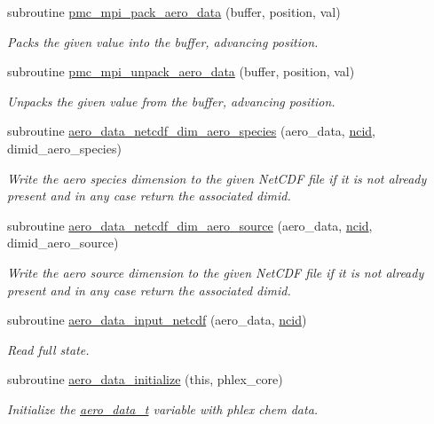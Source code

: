 \begin{DoxyCompactItemize}
subroutine \mbox{\hyperlink{namespacepmc__aero__data_a7017ecdf5894fa10fa518425cd68c9a1}{pmc\+\_\+mpi\+\_\+pack\+\_\+aero\+\_\+data}} (buffer, position, val)
\begin{DoxyCompactList}\small\item\em Packs the given value into the buffer, advancing position. \end{DoxyCompactList}\item 
subroutine \mbox{\hyperlink{namespacepmc__aero__data_a1e003120eba522c801d92c1ebc719dd8}{pmc\+\_\+mpi\+\_\+unpack\+\_\+aero\+\_\+data}} (buffer, position, val)
\begin{DoxyCompactList}\small\item\em Unpacks the given value from the buffer, advancing position. \end{DoxyCompactList}\item 
subroutine \mbox{\hyperlink{namespacepmc__aero__data_a38b14f4b5a7b1ede2bb310e72f5bcf4c}{aero\+\_\+data\+\_\+netcdf\+\_\+dim\+\_\+aero\+\_\+species}} (aero\+\_\+data, \mbox{\hyperlink{fractal_8_f90_a4e89f3f850921ff84a6dfce8b166ad50}{ncid}}, dimid\+\_\+aero\+\_\+species)
\begin{DoxyCompactList}\small\item\em Write the aero species dimension to the given Net\+C\+DF file if it is not already present and in any case return the associated dimid. \end{DoxyCompactList}\item 
subroutine \mbox{\hyperlink{namespacepmc__aero__data_a0ae31a1d2d6652d15476a653d82841c6}{aero\+\_\+data\+\_\+netcdf\+\_\+dim\+\_\+aero\+\_\+source}} (aero\+\_\+data, \mbox{\hyperlink{fractal_8_f90_a4e89f3f850921ff84a6dfce8b166ad50}{ncid}}, dimid\+\_\+aero\+\_\+source)
\begin{DoxyCompactList}\small\item\em Write the aero source dimension to the given Net\+C\+DF file if it is not already present and in any case return the associated dimid. \end{DoxyCompactList}\item 
subroutine \mbox{\hyperlink{namespacepmc__aero__data_abcbb5ca81ead994280b5ea92f58172d8}{aero\+\_\+data\+\_\+input\+\_\+netcdf}} (aero\+\_\+data, \mbox{\hyperlink{fractal_8_f90_a4e89f3f850921ff84a6dfce8b166ad50}{ncid}})
\begin{DoxyCompactList}\small\item\em Read full state. \end{DoxyCompactList}\item 
subroutine \mbox{\hyperlink{namespacepmc__aero__data_a8496aa9cb03cd761a535fe6afb381059}{aero\+\_\+data\+\_\+initialize}} (this, phlex\+\_\+core)
\begin{DoxyCompactList}\small\item\em Initialize the \mbox{\hyperlink{structpmc__aero__data_1_1aero__data__t}{aero\+\_\+data\+\_\+t}} variable with phlex chem data. \end{DoxyCompactList}\end{DoxyCompactItemize}
